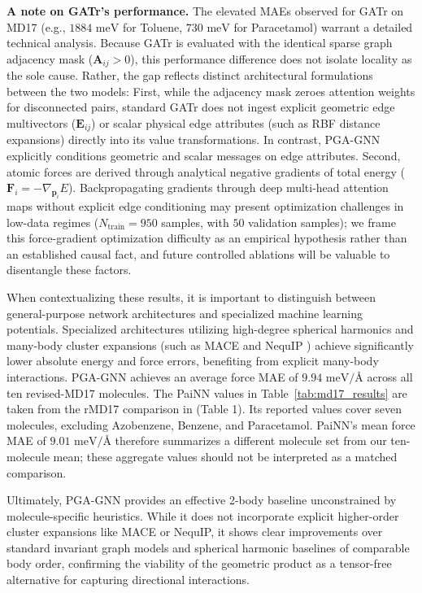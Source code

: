 \documentclass[10pt]{article}
\begin{document}
\noindent
\textbf{A note on GATr's performance.} 
The elevated MAEs observed for GATr on MD17 (e.g., $1884\text{ meV}$ for Toluene, $730\text{ meV}$ for Paracetamol) warrant a detailed technical analysis. Because GATr is evaluated with the identical sparse graph adjacency mask ($\mathbf{A}_{ij} > 0$), this performance difference does not isolate locality as the sole cause. Rather, the gap reflects distinct architectural formulations between the two models:
First, while the adjacency mask zeroes attention weights for disconnected pairs, standard GATr does not ingest explicit geometric edge multivectors ($\mathbf{E}_{ij}$) or scalar physical edge attributes (such as RBF distance expansions) directly into its value transformations. In contrast, PGA-GNN explicitly conditions geometric and scalar messages on edge attributes.
Second, atomic forces are derived through analytical negative gradients of total energy ($\mathbf{F}_i = -\nabla_{\mathbf{p}_i} E$). Backpropagating gradients through deep multi-head attention maps without explicit edge conditioning may present optimization challenges in low-data regimes ($N_{\text{train}} = 950$ samples, with $50$ validation samples); we frame this force-gradient optimization difficulty as an empirical hypothesis rather than an established causal fact, and future controlled ablations will be valuable to disentangle these factors.

\noindent
When contextualizing these results, it is important to distinguish between general-purpose network architectures and specialized machine learning potentials. Specialized architectures utilizing high-degree spherical harmonics and many-body cluster expansions (such as MACE \citep{mace} and NequIP \citep{neuqip}) achieve significantly lower absolute energy and force errors, benefiting from explicit many-body interactions. PGA-GNN achieves an average force MAE of $9.94\text{ meV/\AA}$ across all ten revised-MD17 molecules. The PaiNN \citep{painn} values in Table~\ref{tab:md17_results} are taken from the rMD17 comparison in \citet{mace} (Table 1). Its reported values cover seven molecules, excluding Azobenzene, Benzene, and Paracetamol. PaiNN's mean force MAE of $9.01\text{ meV/\AA}$ therefore summarizes a different molecule set from our ten-molecule mean; these aggregate values should not be interpreted as a matched comparison.

Ultimately, PGA-GNN provides an effective 2-body baseline unconstrained by molecule-specific heuristics. While it does not incorporate explicit higher-order cluster expansions like MACE or NequIP, it shows clear improvements over standard invariant graph models and spherical harmonic baselines of comparable body order, confirming the viability of the geometric product as a tensor-free alternative for capturing directional interactions.
\end{document}
